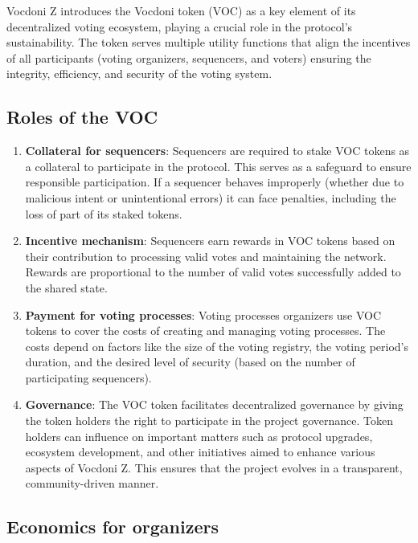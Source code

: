 

Vocdoni Z introduces the Vocdoni token (VOC) as a key element of its decentralized voting ecosystem, playing a crucial role in the protocol's sustainability.
The token serves multiple utility functions that align the incentives of all participants (voting organizers, sequencers, and voters) ensuring the integrity, efficiency, and security of the voting system.

\subsection{Roles of the VOC}

\begin{enumerate}
	\item \textbf{Collateral for sequencers}: Sequencers are required to stake VOC tokens as a collateral to participate in the protocol. This serves as a safeguard to ensure responsible participation. If a sequencer behaves improperly (whether due to malicious intent or unintentional errors) it can face penalties, including the loss of part of its staked tokens.
	\item \textbf{Incentive mechanism}: Sequencers earn rewards in VOC tokens based on their contribution to processing valid votes and maintaining the network. Rewards are proportional to the number of valid votes successfully added to the shared state.
	\item \textbf{Payment for voting processes}: Voting processes organizers use VOC tokens to cover the costs of creating and managing voting processes. The costs depend on factors like the size of the voting registry, the voting period's duration, and the desired level of security (based on the number of participating sequencers).
	\item \textbf{Governance}: The VOC token facilitates decentralized governance by giving the token holders the right to participate in the project governance. Token holders can influence on important matters such as protocol upgrades, ecosystem development, and other initiatives aimed to enhance various aspects of Vocdoni Z. This ensures that the project evolves in a transparent, community-driven manner.
\end{enumerate}

\subsection{Economics for organizers}

